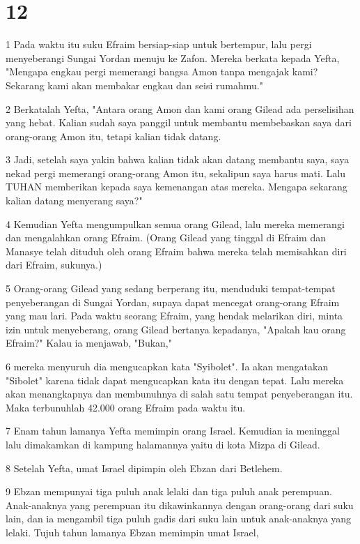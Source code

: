 \chapter{12}

\par 1 Pada waktu itu suku Efraim bersiap-siap untuk bertempur, lalu pergi menyeberangi Sungai Yordan menuju ke Zafon. Mereka berkata kepada Yefta, "Mengapa engkau pergi memerangi bangsa Amon tanpa mengajak kami? Sekarang kami akan membakar engkau dan seisi rumahmu."
\par 2 Berkatalah Yefta, "Antara orang Amon dan kami orang Gilead ada perselisihan yang hebat. Kalian sudah saya panggil untuk membantu membebaskan saya dari orang-orang Amon itu, tetapi kalian tidak datang.
\par 3 Jadi, setelah saya yakin bahwa kalian tidak akan datang membantu saya, saya nekad pergi memerangi orang-orang Amon itu, sekalipun saya harus mati. Lalu TUHAN memberikan kepada saya kemenangan atas mereka. Mengapa sekarang kalian datang menyerang saya?"
\par 4 Kemudian Yefta mengumpulkan semua orang Gilead, lalu mereka memerangi dan mengalahkan orang Efraim. (Orang Gilead yang tinggal di Efraim dan Manasye telah dituduh oleh orang Efraim bahwa mereka telah memisahkan diri dari Efraim, sukunya.)
\par 5 Orang-orang Gilead yang sedang berperang itu, menduduki tempat-tempat penyeberangan di Sungai Yordan, supaya dapat mencegat orang-orang Efraim yang mau lari. Pada waktu seorang Efraim, yang hendak melarikan diri, minta izin untuk menyeberang, orang Gilead bertanya kepadanya, "Apakah kau orang Efraim?" Kalau ia menjawab, "Bukan,"
\par 6 mereka menyuruh dia mengucapkan kata "Syibolet". Ia akan mengatakan "Sibolet" karena tidak dapat mengucapkan kata itu dengan tepat. Lalu mereka akan menangkapnya dan membunuhnya di salah satu tempat penyeberangan itu. Maka terbunuhlah 42.000 orang Efraim pada waktu itu.
\par 7 Enam tahun lamanya Yefta memimpin orang Israel. Kemudian ia meninggal lalu dimakamkan di kampung halamannya yaitu di kota Mizpa di Gilead.
\par 8 Setelah Yefta, umat Israel dipimpin oleh Ebzan dari Betlehem.
\par 9 Ebzan mempunyai tiga puluh anak lelaki dan tiga puluh anak perempuan. Anak-anaknya yang perempuan itu dikawinkannya dengan orang-orang dari suku lain, dan ia mengambil tiga puluh gadis dari suku lain untuk anak-anaknya yang lelaki. Tujuh tahun lamanya Ebzan memimpin umat Israel,
